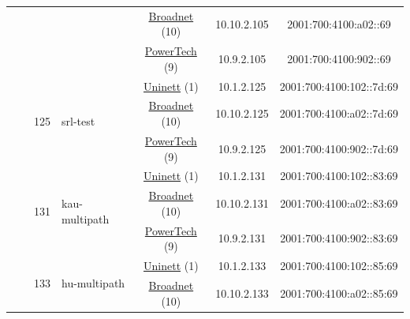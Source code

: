\begin{small}
\begin{center}
\begin{longtable}{|c|c|c|c|c|c|c|c|}
  &  & \multicolumn{2}{|c|}{} & \multicolumn{2}{|c|}{\tiny{\href{https://www.broadnet.no}{Broadnet} (10)}} & \tiny{10.10.2.105} & \tiny{2001:700:4100:a02::69} \\* \cline{5-5}\cline{6-6}\cline{7-7}\cline{8-8}
  &  & \multicolumn{2}{|c|}{} & \multicolumn{2}{|c|}{\tiny{\href{http://www.powertech.no}{PowerTech} (9)}} & \tiny{10.9.2.105} & \tiny{2001:700:4100:902::69} \\* \cline{3-3}\cline{4-4}\cline{5-5}\cline{6-6}\cline{7-7}\cline{8-8}
  &  & \multirow{3}{*}{\tiny{125}} & \multicolumn{1}{|l|}{\multirow{3}{*}{\tiny{srl-test}}} & \multicolumn{2}{|c|}{\tiny{\href{https://www.uninett.no}{Uninett} (1)}} & \tiny{10.1.2.125} & \tiny{2001:700:4100:102::7d:69} \\* \cline{5-5}\cline{6-6}\cline{7-7}\cline{8-8}
  &  &  &  & \multicolumn{2}{|c|}{\tiny{\href{https://www.broadnet.no}{Broadnet} (10)}} & \tiny{10.10.2.125} & \tiny{2001:700:4100:a02::7d:69} \\* \cline{5-5}\cline{6-6}\cline{7-7}\cline{8-8}
  &  &  &  & \multicolumn{2}{|c|}{\tiny{\href{http://www.powertech.no}{PowerTech} (9)}} & \tiny{10.9.2.125} & \tiny{2001:700:4100:902::7d:69} \\* \cline{3-3}\cline{4-4}\cline{5-5}\cline{6-6}\cline{7-7}\cline{8-8}
  &  & \multirow{3}{*}{\tiny{131}} & \multicolumn{1}{|l|}{\multirow{3}{*}{\tiny{kau-multipath}}} & \multicolumn{2}{|c|}{\tiny{\href{https://www.uninett.no}{Uninett} (1)}} & \tiny{10.1.2.131} & \tiny{2001:700:4100:102::83:69} \\* \cline{5-5}\cline{6-6}\cline{7-7}\cline{8-8}
  &  &  &  & \multicolumn{2}{|c|}{\tiny{\href{https://www.broadnet.no}{Broadnet} (10)}} & \tiny{10.10.2.131} & \tiny{2001:700:4100:a02::83:69} \\* \cline{5-5}\cline{6-6}\cline{7-7}\cline{8-8}
  &  &  &  & \multicolumn{2}{|c|}{\tiny{\href{http://www.powertech.no}{PowerTech} (9)}} & \tiny{10.9.2.131} & \tiny{2001:700:4100:902::83:69} \\* \cline{3-3}\cline{4-4}\cline{5-5}\cline{6-6}\cline{7-7}\cline{8-8}
  &  & \multirow{3}{*}{\tiny{133}} & \multicolumn{1}{|l|}{\multirow{3}{*}{\tiny{hu-multipath}}} & \multicolumn{2}{|c|}{\tiny{\href{https://www.uninett.no}{Uninett} (1)}} & \tiny{10.1.2.133} & \tiny{2001:700:4100:102::85:69} \\* \cline{5-5}\cline{6-6}\cline{7-7}\cline{8-8}
  &  &  &  & \multicolumn{2}{|c|}{\tiny{\href{https://www.broadnet.no}{Broadnet} (10)}} & \tiny{10.10.2.133} & \tiny{2001:700:4100:a02::85:69} \\* \cline{5-5}\cline{6-6}\cline{7-7}\cline{8-8}

\end{longtable}
\end{center}
\end{small}
